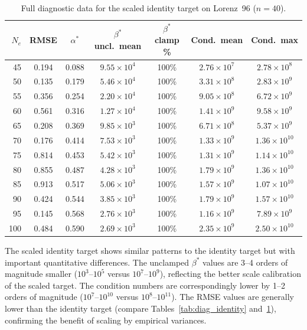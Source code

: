 \begin{table}[htbp]
\centering
\caption{Full diagnostic data for the scaled identity target on Lorenz~96 ($n = 40$).}
\label{tab:diag_scaled}
\begin{tabular}{@{}rcccccc@{}}
\toprule
$N_e$ & RMSE & $\alpha^*$ & $\beta^*$ uncl.\ mean & $\beta^*$ clamp \% & Cond.\ mean & Cond.\ max \\
\midrule
45  & 0.194 & 0.088 & $9.55 \times 10^4$  & 100\% & $2.76 \times 10^7$  & $2.78 \times 10^8$ \\
50  & 0.135 & 0.179 & $5.46 \times 10^4$  & 100\% & $3.31 \times 10^8$  & $2.83 \times 10^9$ \\
55  & 0.356 & 0.254 & $2.20 \times 10^4$  & 100\% & $9.05 \times 10^8$  & $6.72 \times 10^9$ \\
60  & 0.561 & 0.316 & $1.27 \times 10^4$  & 100\% & $1.41 \times 10^9$  & $9.58 \times 10^9$ \\
65  & 0.208 & 0.369 & $9.85 \times 10^3$  & 100\% & $6.71 \times 10^8$  & $5.37 \times 10^9$ \\
70  & 0.176 & 0.414 & $7.53 \times 10^3$  & 100\% & $1.33 \times 10^9$  & $1.36 \times 10^{10}$ \\
75  & 0.814 & 0.453 & $5.42 \times 10^3$  & 100\% & $1.31 \times 10^9$  & $1.14 \times 10^{10}$ \\
80  & 0.855 & 0.487 & $4.28 \times 10^3$  & 100\% & $1.79 \times 10^9$  & $1.36 \times 10^{10}$ \\
85  & 0.913 & 0.517 & $5.06 \times 10^3$  & 100\% & $1.57 \times 10^9$  & $1.07 \times 10^{10}$ \\
90  & 0.424 & 0.544 & $3.85 \times 10^3$  & 100\% & $1.79 \times 10^9$  & $1.57 \times 10^{10}$ \\
95  & 0.145 & 0.568 & $2.76 \times 10^3$  & 100\% & $1.16 \times 10^9$  & $7.89 \times 10^9$ \\
100 & 0.484 & 0.590 & $2.69 \times 10^3$  & 100\% & $2.35 \times 10^9$  & $2.50 \times 10^{10}$ \\
\bottomrule
\end{tabular}
\end{table}

The scaled identity target shows similar patterns to the identity target but with important quantitative differences. The unclamped $\beta^*$ values are 3--4 orders of magnitude smaller ($10^3$--$10^5$ versus $10^7$--$10^9$), reflecting the better scale calibration of the scaled target. The condition numbers are correspondingly lower by 1--2 orders of magnitude ($10^7$--$10^{10}$ versus $10^8$--$10^{11}$). The RMSE values are generally lower than the identity target (compare Tables~\ref{tab:diag_identity} and~\ref{tab:diag_scaled}), confirming the benefit of scaling by empirical variances.

